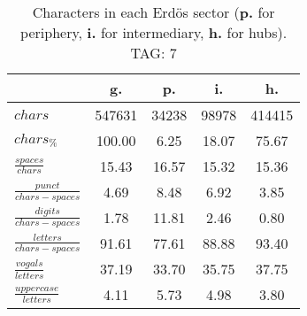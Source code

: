 \begin{table}[h!]
\begin{center}
\begin{tabular}{| l | c | c | c | c |}\hline
 & g. & p. & i. & h. \\\hline
$chars$ & 547631  & 34238  & 98978  & 414415 \\\hline
$chars_{\%}$ & 100.00  & 6.25  & 18.07  & 75.67 \\\hline
$\frac{spaces}{chars}$ & 15.43  & 16.57  & 15.32  & 15.36 \\\hline
$\frac{punct}{chars-spaces}$ & 4.69  & 8.48  & 6.92  & 3.85 \\\hline
$\frac{digits}{chars-spaces}$ & 1.78  & 11.81  & 2.46  & 0.80 \\\hline
$\frac{letters}{chars-spaces}$ & 91.61  & 77.61  & 88.88  & 93.40 \\\hline
$\frac{vogals}{letters}$ & 37.19  & 33.70  & 35.75  & 37.75 \\\hline
$\frac{uppercase}{letters}$ & 4.11  & 5.73  & 4.98  & 3.80 \\\hline
\end{tabular}
\caption{Characters in each Erd\"os sector ({{\bf p.}} for periphery, {{\bf i.}} for intermediary, 
    {{\bf h.}} for hubs). TAG: 7}
\end{center}
\end{table}